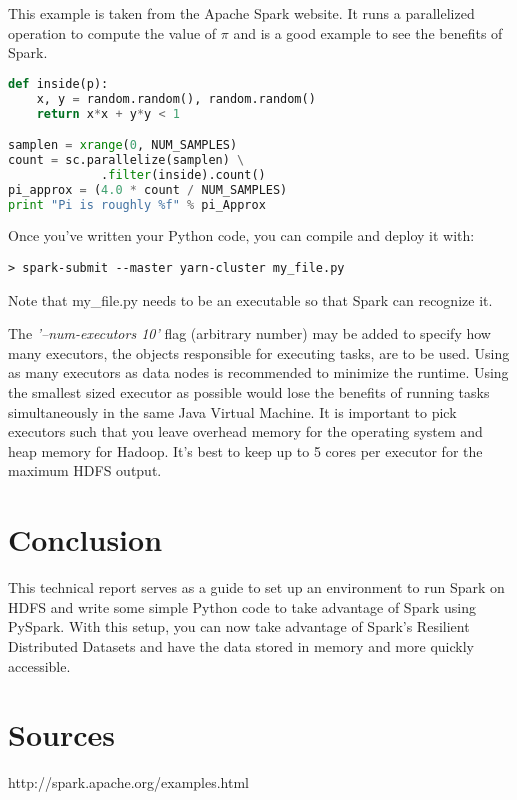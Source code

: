 \documentclass[9pt,twocolumn,twoside]{idsi}
\begin{document}
This example is taken from the Apache Spark website. It runs a parallelized operation to compute the value of $\pi$ and is a good example to see the benefits of Spark.

\begin{lstlisting}[language=Python]
def inside(p):
    x, y = random.random(), random.random()
    return x*x + y*y < 1

samplen = xrange(0, NUM_SAMPLES)
count = sc.parallelize(samplen) \
             .filter(inside).count()
pi_approx = (4.0 * count / NUM_SAMPLES)
print "Pi is roughly %f" % pi_Approx
\end{lstlisting}

Once you've written your Python code, you can compile and deploy it with:
\begin{verbatim}
> spark-submit --master yarn-cluster my_file.py
\end{verbatim}
Note that my\_file.py needs to be an executable so that Spark can recognize it.

\noindent


The \textit{'--num-executors 10'} flag (arbitrary number) may be added to specify how many executors, the objects responsible for executing tasks, are to be used. Using as many executors as data nodes is recommended to minimize the runtime. Using the smallest sized executor as possible would lose the benefits of running tasks simultaneously in the same Java Virtual Machine. It is important to pick executors such that you leave overhead memory for the operating system and heap memory for Hadoop. It's best to keep up to 5 cores per executor for the maximum HDFS output. 

\section{Conclusion}

This technical report serves as a guide to set up an environment to run Spark on HDFS and write some simple Python code to take advantage of Spark using PySpark. With this setup, you can now take advantage of Spark's Resilient Distributed Datasets and have the data stored in memory and more quickly accessible.

\section{Sources}

http://spark.apache.org/examples.html
\end{document}
